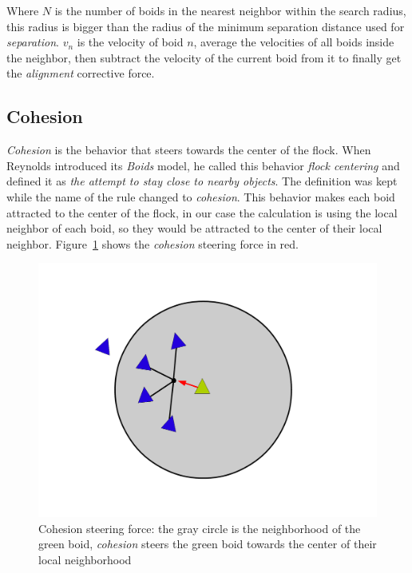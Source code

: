 Where $N$ is the number of boids in the nearest neighbor within the search radius, this radius is bigger than the radius of the minimum separation distance used for \textit{separation}. $v_n$ is the velocity of boid $n$, average the velocities of all boids inside the neighbor, then subtract the velocity of the current boid from it to finally get the \textit{alignment} corrective force.

\subsection{Cohesion}
\textit{Cohesion} is the behavior that steers towards the center of the flock. When Reynolds introduced its \textit{Boids} model, he called this behavior \textit{flock centering} and defined it as \textit{the attempt to stay close to nearby objects}. The definition was kept while the name of the rule changed to \textit{cohesion}. This behavior makes each boid attracted to the center of the flock, in our case the calculation is using the local neighbor of each boid, so they would be attracted to the center of their local neighbor.  Figure~\ref{cohesionPDF} shows the \textit{cohesion} steering force in red.

\begin{figure}[htbp]
\begin{center}
\includegraphics[scale=0.3]{figures/cohesion.pdf}
\caption{Cohesion steering force: the gray circle is the neighborhood of the green boid, \textit{cohesion} steers the green boid towards the center of their local neighborhood}
\label{cohesionPDF}
\end{center}
\end{figure}

